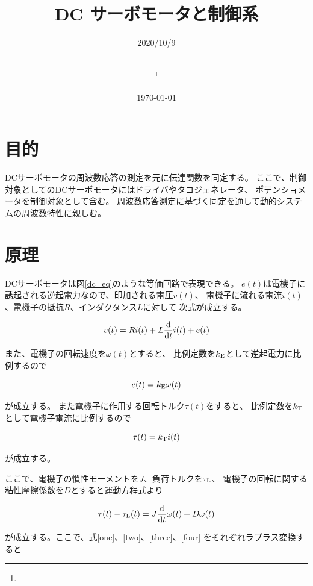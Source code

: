 \documentclass[uplatex, 11pt,a4j, titlepage]{jsarticle}
\title{DC サーボモータと制御系}
\date{\today}
\author{
    \small{\myid} \\
    \myname\thanks{\mymail}
}
\begin{document}
\maketitle


\subtitle{2020/10/9}

\section{目的}
DCサーボモータの周波数応答の測定を元に伝達関数を同定する。
ここで、制御対象としてのDCサーボモータにはドライバやタコジェネレータ、
ポテンショメータを制御対象として含む。
周波数応答測定に基づく同定を通して動的システムの周波数特性に親しむ。
\section{原理}
DCサーボモータは図\ref{dc_eq}のような等価回路で表現できる。
$e(t)$は電機子に誘起される逆起電力なので、印加される電圧$v(t)$、
電機子に流れる電流$i(t)$、電機子の抵抗$R$、インダクタンス$L$に対して
次式が成立する。

\begin{equation}\label{one}
    v(t) = Ri(t) + L\frac{\rm d}{{\rm d}t}i(t) + e(t)
\end{equation}

また、電機子の回転速度を$\omega (t)$とすると、
比例定数を$k_{\rm E}$として逆起電力に比例するので

\begin{equation}\label{two}
    e(t) = k_{\rm E} \omega (t)
\end{equation}

が成立する。
また電機子に作用する回転トルク$\tau (t)$をすると、
比例定数を$k_{\rm T}$として電機子電流に比例するので

\begin{equation}\label{three}
    \tau (t)=k_{\rm T} i(t)
\end{equation}

が成立する。

ここで、電機子の慣性モーメントを$J$、負荷トルクを$\tau_{\rm L}$、
電機子の回転に関する粘性摩擦係数を$D$とすると運動方程式より

\begin{equation}\label{four}
    \tau (t) - \tau_{\rm L}(t)
        = J \frac{\rm d}{{\rm d}t} \omega (t) + D\omega(t)
\end{equation}

が成立する。ここで、式\ref{one}、\ref{two}、\ref{three}、\ref{four}
をそれぞれラプラス変換すると
\end{document}
